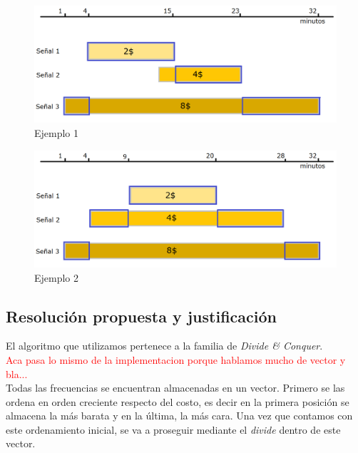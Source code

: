\documentclass[a4paper]{article}
\begin{document}
 \begin{figure}[h!]
   \begin{center}
 	\includegraphics[scale=0.45]{imagenes/ej2/ejemplo1.png}
 	\caption{Ejemplo 1}
   \end{center}
 \end{figure}

 \begin{figure}[h!]
   \begin{center}
 	\includegraphics[scale=0.45]{imagenes/ej2/ejemplo2.png}
 	\caption{Ejemplo 2}
   \end{center}
 \end{figure}


\newpage

\subsection{Resoluci\'on propuesta y justificaci\'on}

El algoritmo que utilizamos pertenece a la familia de \emph{Divide \& Conquer}.\\

\textcolor{red}{Aca pasa lo mismo de la implementacion porque hablamos mucho de vector y bla...}\\

Todas las frecuencias se encuentran almacenadas en un vector. Primero se las ordena en orden creciente respecto del costo, es decir en la primera posición se almacena la m\'as barata y en la última, la más cara. Una vez que contamos con este ordenamiento inicial, se va a proseguir mediante el \emph{divide} dentro de este vector.\\
\end{document}
